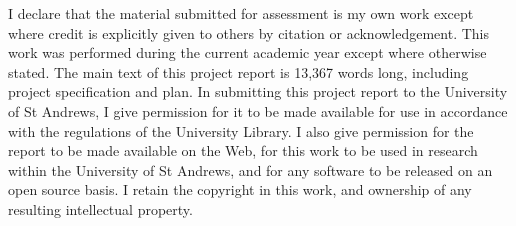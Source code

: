 I declare that the material submitted for assessment is my own work except
where credit is explicitly given to others by citation or acknowledgement. This
work was performed during the current academic year except where otherwise
stated. The main text of this project report is 13,367 words long, including
project specification and plan. In submitting this project report to the
University of St Andrews, I give permission for it to be made available for use
in accordance with the regulations of the University Library. I also give
permission for the report to be made available on the Web, for this work to be
used in research within the University of St Andrews, and for any software to
be released on an open source basis. I retain the copyright in this work, and
ownership of any resulting intellectual property.